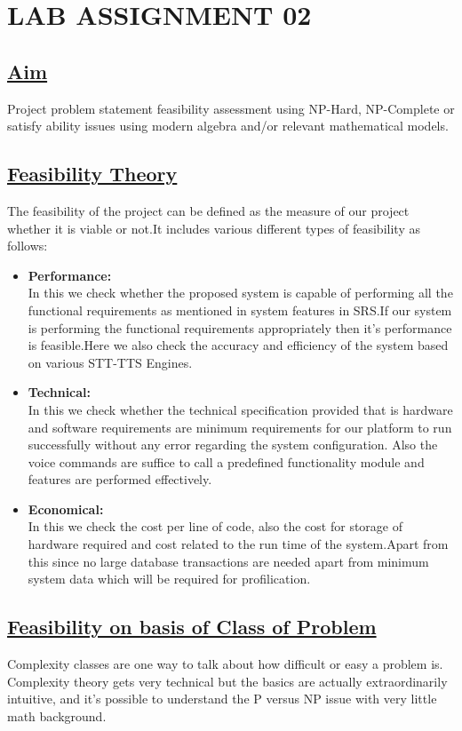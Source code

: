 \section*{\centering\LARGE{LAB ASSIGNMENT 02}}
\subsection*{\underline{Aim}}
Project problem statement feasibility assessment using NP-Hard, NP-Complete or satisfy ability issues using modern algebra and/or relevant mathematical models.

\subsection*{\underline{Feasibility Theory}}
The feasibility of the project can be defined as the measure of our project whether it is viable or not.It includes various different types of feasibility as follows:
\begin{itemize}
\item \textbf{Performance:}\\
In this we check whether the proposed system is capable of performing all the functional requirements as mentioned in system features in SRS.If our system is performing the functional requirements appropriately then it's performance is feasible.Here we also check the accuracy and efficiency of the system based on various STT-TTS Engines.
\item \textbf{Technical:}\\
In this we check whether the technical specification provided that is hardware and software requirements are minimum requirements for our platform to run successfully without any error regarding the system configuration. Also the voice commands are suffice to call a predefined functionality module and features are performed effectively.
\item \textbf{Economical:}\\
In this we check the cost per line of code, also the cost for storage of hardware required and cost related to the run time of the system.Apart from this since no large database transactions are needed apart from minimum system data which will be required for profilication.

\end{itemize}
\noindent
\subsection*{\underline{Feasibility on basis of Class of Problem}}
\hspace{3em}Complexity classes are one way to talk about how difficult or easy a problem is.
Complexity theory gets very technical but the basics are actually extraordinarily
intuitive, and it's possible to understand the P versus NP issue with very little
math background.\\


